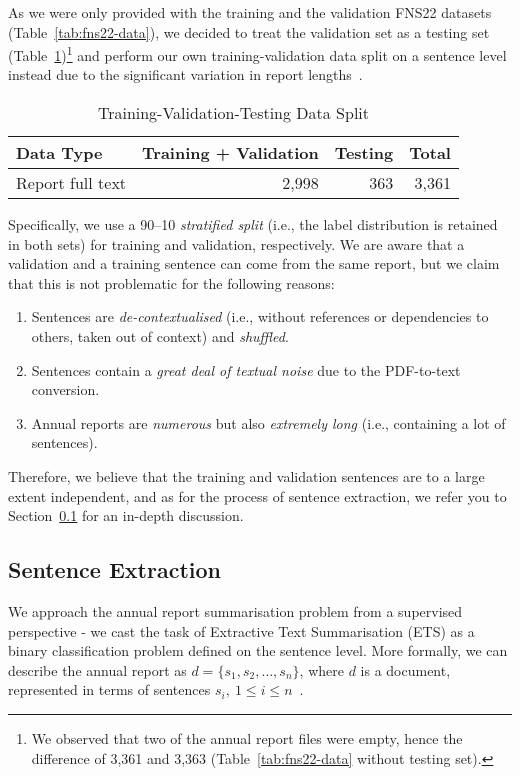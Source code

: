 As we were only provided with the training and the validation FNS22 datasets (Table~\ref{tab:fns22-data}),
we decided to treat the validation set as a testing set (Table~\ref{tab:fns22-my-data})\footnote{
    We observed that two of the annual report files were empty, hence the difference of 3,361 and 3,363 (Table~\ref{tab:fns22-data} without testing set).
} and perform our own training-validation data split on a sentence level instead due to the significant variation in report lengths~\cite{litvak-vanetik-2021-summarization}.
\begin{table}[h]
    \centering
    \begin{tabular}{lrr r}
        \hline
        Data Type & Training + Validation & Testing & Total \\
        \midrule
        Report full text & 2,998 & 363 & 3,361 \\
        \bottomrule
    \end{tabular}
    \caption{Training-Validation-Testing Data Split}
    \label{tab:fns22-my-data}
\end{table}
Specifically, we use a 90--10 \emph{stratified split} (i.e., the label distribution is retained in both sets) for training and validation, respectively.
We are aware that a validation and a training sentence can come from the same report, but we claim that this is not problematic for the following reasons:
\begin{enumerate}
    \item Sentences are \emph{de-contextualised} (i.e., without references or dependencies to others, taken out of context) and \emph{shuffled}.
    \item Sentences contain a \emph{great deal of textual noise} due to the PDF-to-text conversion.
    \item Annual reports are \emph{numerous} but also \emph{extremely long} (i.e., containing a lot of sentences).
\end{enumerate}
Therefore, we believe that the training and validation sentences are to a large extent independent, and as for the process of sentence extraction, we refer you to Section~\ref{subsec:sentence_extraction} for an in-depth discussion.

\subsection{Sentence Extraction}\label{subsec:sentence_extraction}
We approach the annual report summarisation problem from a supervised perspective - we cast the task of Extractive Text Summarisation (ETS) as a binary classification problem defined on the sentence level.
More formally, we can describe the annual report as $d=\{s_{1}, s_{2}, \dots, s_{n}\}$, where $d$ is a document, represented in terms of sentences $s_{i}, \  1 \leq i \leq n$~\cite{liu2019finetuningbert}.

